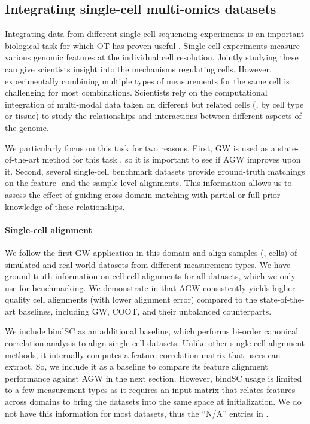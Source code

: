 \subsection{Integrating single-cell multi-omics datasets}
Integrating data from different single-cell sequencing experiments is
an important biological task for which OT has proven useful \citep{Pamona,UniPort,Demetci20}.
Single-cell experiments measure various genomic features at the individual cell resolution.
Jointly studying these can give scientists insight into the mechanisms regulating cells.
However, experimentally combining multiple types of measurements for the same cell
is challenging for most combinations. Scientists rely on the computational integration
of multi-modal data taken on different but related cells (\eg, by cell type or tissue)
to study the relationships and interactions between different aspects of the genome.

We particularly focus on this task for two reasons. First, GW is used as a state-of-the-art
method for this task \citep{Pamona,Demetci22,UniPort}, so it is important to see if
AGW improves upon it. Second, several single-cell benchmark datasets provide
ground-truth matchings on the feature- and the sample-level alignments.
This information allows us to assess the effect of guiding cross-domain matching with partial
or full prior knowledge of these relationships.

\paragraph{Single-cell alignment} We follow the first GW application in this domain
\citep{Demetci20} and align samples (\ie, cells) of simulated and real-world datasets
from different measurement types. We have ground-truth information on cell-cell alignments
for all datasets, which we only use for benchmarking. We demonstrate in 
that AGW consistently yields higher quality cell alignments (with lower alignment error)
compared to the state-of-the-art baselines, including GW, COOT, and their unbalanced counterparts.

We include bindSC as an additional baseline, which performs bi-order canonical correlation analysis
to align single-cell datasets. Unlike other single-cell alignment methods,
it internally computes a feature correlation matrix that users can extract. So,
we include it as a baseline to compare its feature alignment performance against
AGW in the next section. However, bindSC usage is limited to a few measurement types
as it requires an input matrix that relates features across domains to bring the datasets
into the same space at initialization. We do not have this information for most datasets,
thus the ``N/A'' entries in .

